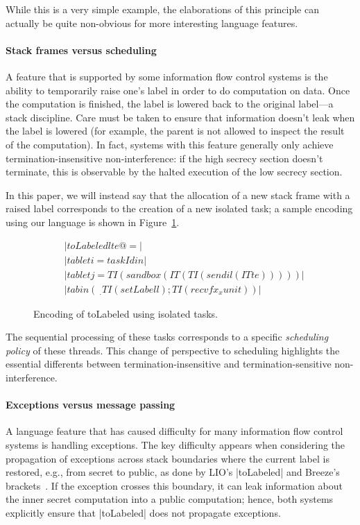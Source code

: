 While this is a very simple example, the elaborations of this principle
can actually be quite non-obvious for more interesting language
features.

\paragraph{Stack frames versus scheduling}  A feature that is supported
by some information flow control systems is the ability to temporarily
raise one's label in order to do computation on data.  Once the
computation is finished, the label is lowered back to the original
label---a stack discipline.  Care must be taken to ensure that
information doesn't leak when the label is lowered (for example, the
parent is not allowed to inspect the result of the computation). In
fact, systems with this feature generally only achieve
termination-insensitive non-interference: if the high secrecy section
doesn't terminate, this is observable by the halted execution of the low
secrecy section.

In this paper, we will instead say that the allocation of a new
stack frame with a raised label corresponds to the creation of a
new isolated task; a sample encoding using our language is
shown in Figure~\ref{fig:toLabeled}.

\begin{figure}
\begin{align*}
    & |toLabeled l te @= | \\
    & |tab let i = taskId in| \\
    & |tab let j = TI (sandbox (IT (TI (send i l (IT te)))))| \\
    & |tab in (\ _ . TI (setLabel l); TI (recvf x _ x unit))|
\end{align*}
\caption{Encoding of toLabeled using isolated tasks.}\label{fig:toLabeled}
\end{figure}

The sequential processing of these
tasks corresponds to a specific \emph{scheduling policy} of these
threads.  This change of perspective to scheduling highlights the
essential differents between termination-insensitive and termination-sensitive
non-interference.

\paragraph{Exceptions versus message passing}
A language feature that has caused difficulty for
many information flow control systems is handling exceptions.
%
The key difficulty appears when considering the propagation of exceptions
across stack boundaries where the current label is restored, e.g., from secret
to public, as done by LIO's |toLabeled| and Breeze's
brackets~\cite{Hritcu:2013:YIB:2497621.2498098, stefan:2012:arxiv-flexible}.
%
If the exception crosses this boundary, it can leak information about the
inner secret computation into a public computation; hence, both systems
explicitly ensure that |toLabeled| does not propagate exceptions.

